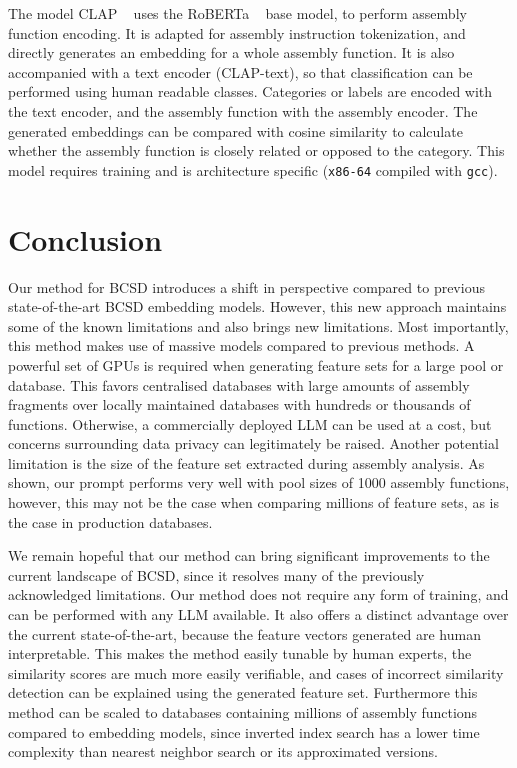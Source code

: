 \documentclass[conference,compsoc]{IEEEtran}
\begin{document}
The model CLAP ~\cite{CLAP} uses the RoBERTa ~\cite{RoBERTa} base model, to perform assembly function encoding.
It is adapted for assembly instruction tokenization, and directly generates an embedding for
a whole assembly function. It is also accompanied with a text encoder (CLAP-text), so that classification can
be performed using human readable classes. Categories or labels are encoded with the text encoder, and the
assembly function with the assembly encoder. The generated embeddings can be compared with cosine similarity to
calculate whether the assembly function is closely related or opposed to the category. This model requires
training and is architecture specific (\texttt{x86-64} compiled with \texttt{gcc}).

\section{Conclusion}

Our method for BCSD introduces a shift in perspective compared to previous state-of-the-art BCSD embedding models. However,
this new approach maintains some of the known limitations and also brings new limitations. Most importantly, this
method makes use of massive models compared to previous methods. A powerful set of GPUs is required when generating
feature sets for a large pool or database. This favors centralised databases with large amounts of assembly fragments over
locally maintained databases with hundreds or thousands of functions. Otherwise, a commercially deployed LLM can be used at a
cost, but concerns surrounding data privacy can legitimately be raised. Another potential limitation is the size of the feature
set extracted during assembly analysis. As shown, our prompt performs very well with pool sizes of 1000 assembly functions,
however, this may not be the case when comparing millions of feature sets, as is the case in production databases.

We remain hopeful that our method can bring significant improvements to the current landscape of BCSD, since it resolves
many of the previously acknowledged limitations. Our method does not require any form of training, and can be performed with any LLM
available. It also offers a distinct advantage over the current state-of-the-art, because the feature vectors generated are human
interpretable. This makes the method easily tunable by human experts, the similarity scores are much more easily verifiable, and
cases of incorrect similarity detection can be explained using the generated feature set. Furthermore this method can be scaled to
databases containing millions of assembly functions compared to embedding models, since inverted index search has a lower time
complexity than nearest neighbor search or its approximated versions.
\end{document}
